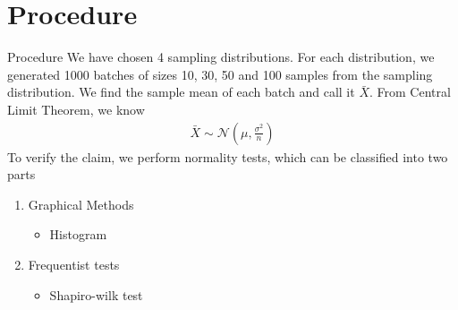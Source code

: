 \documentclass[10pt]{beamer}
\begin{document}
\section{Procedure}
\begin{frame}{Procedure}
We have chosen 4 sampling distributions. For each distribution, we generated 1000 batches of sizes 10, 30, 50 and 100 samples from the sampling distribution. We find the sample mean of each batch and call it $\bar{X}$. From Central Limit Theorem, we know
\begin{align}
    \bar{X} \sim \mathcal{N}\left(\mu, \frac{\sigma^2}{n}\right)
\end{align}
To verify the claim, we perform normality tests, which can be classified into two parts
\begin{enumerate}
    \item Graphical Methods
    \begin{itemize}
        \item Histogram
    \end{itemize}
    \item{Frequentist tests}
    \begin{itemize}
        \item Shapiro-wilk test
    \end{itemize}
\end{enumerate}
\end{frame}
\end{document}
